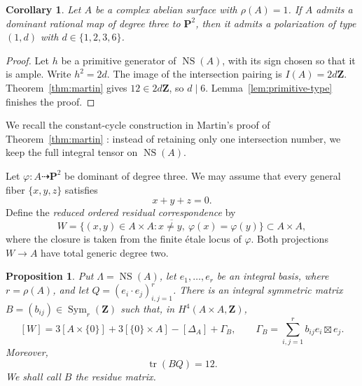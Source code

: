 \documentclass[12pt]{amsart}
\numberwithin{equation}{section}
\newtheorem{proposition}[theorem]{Proposition}
\newtheorem{corollary}[theorem]{Corollary}
\theoremstyle{definition}
\theoremstyle{remark}
\newcommand{\Z}{\mathbf Z}
\newcommand{\PP}{\mathbf P}
\newcommand{\NS}{\operatorname{NS}}
\newcommand{\Sym}{\operatorname{Sym}}
\newcommand{\tr}{\operatorname{tr}}
\begin{document}
\begin{corollary}\label{prop:rank-one-necessity}
Let \(A\) be a complex abelian surface with \(\rho(A)=1\).  If \(A\)
admits a dominant rational map of degree three to \(\PP^2\), then it
admits a polarization of type \((1,d)\) with
\(d\in\{1,2,3,6\}\).
\end{corollary}

\begin{proof}
Let \(h\) be a primitive generator of \(\NS(A)\), with its sign chosen
so that it is ample.  Write \(h^2=2d\).  The image of the intersection
pairing is \(I(A)=2d\Z\).  Theorem~\ref{thm:martin} gives
\(12\in2d\Z\), so \(d\mid6\).  Lemma~\ref{lem:primitive-type}
finishes the proof.
\end{proof}

We recall the constant-cycle construction in Martin's
proof of Theorem~\ref{thm:martin}
\cite[proof of Theorem~1.1]{Martin}: instead of retaining only one
intersection number, we keep the full integral tensor on
\(\NS(A)\).

Let $\varphi:A\dashrightarrow\PP^2$
be dominant of degree three.  
We may assume that every general
fiber \(\{x,y,z\}\) satisfies
\begin{equation}\label{eq:fiber-sum}
                              x+y+z=0.
\end{equation}
Define the \emph{reduced ordered residual correspondence} by
\begin{equation*}\label{eq:def-W}
 W=\overline{\{(x,y)\in A\times A:x\neq y,
                    \ \varphi(x)=\varphi(y)\}}\subset A\times A,
\end{equation*}
where the closure is taken from the finite \'etale locus of $\varphi$.  Both
projections $W\to A$ have total generic degree two.

\begin{proposition}\label{prop:residual-class}
Put \(\Lambda=\NS(A)\), let \(e_1,\dots,e_r\) be an integral basis,
where \(r=\rho(A)\), and let \(Q=(e_i\cdot e_j)_{i,j = 1}^r\).  There is an
integral symmetric matrix \(B=(b_{ij})\in\Sym_r(\Z)\) such that, in
\(H^4(A\times A,\Z)\),
\begin{equation}\label{eq:residual-class}
 [W]=3[A\times\{0\}]+3[\{0\}\times A]-[\Delta_A]+\Gamma_B,
 \qquad
 \Gamma_B=\sum_{i,j=1}^r b_{ij}e_i\boxtimes e_j.
\end{equation}
Moreover,
\begin{equation}\label{eq:trace-twelve}
                              \tr(BQ)=12.
\end{equation}
We shall call \(B\) the \emph{residue matrix}.
\end{proposition}
\end{document}
